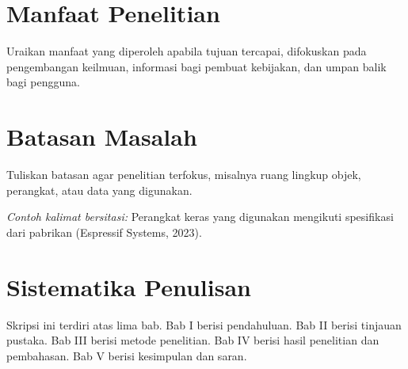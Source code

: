 \section{Manfaat Penelitian}
Uraikan manfaat yang diperoleh apabila tujuan tercapai, difokuskan pada pengembangan keilmuan, informasi bagi pembuat kebijakan, dan umpan balik bagi pengguna.

\section{Batasan Masalah}
Tuliskan batasan agar penelitian terfokus, misalnya ruang lingkup objek, perangkat, atau data yang digunakan.

\textit{Contoh kalimat bersitasi:} Perangkat keras yang digunakan mengikuti spesifikasi dari pabrikan (Espressif Systems, 2023).

\section{Sistematika Penulisan}
Skripsi ini terdiri atas lima bab. Bab I berisi pendahuluan. Bab II berisi tinjauan pustaka. Bab III berisi metode penelitian. Bab IV berisi hasil penelitian dan pembahasan. Bab V berisi kesimpulan dan saran.

